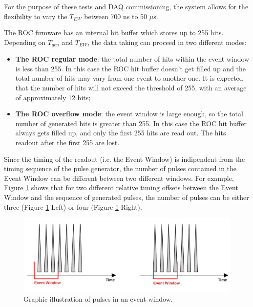     For the purpose of these tests and DAQ commissioning, 
    the system allows for the flexibility to vary 
    the $T_{EW}$ between 700 ns to 50 
    $\mu$s. 

    The ROC firmware has an internal hit buffer 
    which stores up to 255 hits. 
    Depending on $T_{gen}$ and $T_{EW}$, the data 
    taking can proceed in two different modes:
    \begin{itemize}
      \item \textbf{The ROC regular mode}: the total number of hits 
      within the event window is less than 255.
      In this case the ROC hit buffer doesn't get filled up 
      and the total number of 
      hits may vary from one event to another one. It is 
      expected that the number 
      of hits will not exceed the threshold of 255, 
      with an average of approximately 12 hits;
    \item \textbf{The ROC overflow mode}: the event window 
    is large enough, 
    so the total number of generated hits is 
      greater than 255. In this case
      the ROC hit buffer always gets filled up, and only 
      the first 255 hits are read out. 
      The hits readout after the first 255 are lost.
    \end{itemize}

    Since the timing of the readout (i.e. the Event Window) 
    is indipendent from the timing sequence 
    of the pulse generator, the number of pulses contained in 
    the Event Window can be different between two different 
    windows. 
    For example, Figure \ref{fig:timing} shows 
    that for two different relative timing offsets between 
    the Event Window and the sequence of generated pulses, 
    the number of pulses can be 
    either three (Figure \ref{fig:timing} Left) 
    or four (Figure \ref{fig:timing} Right).

    \begin{figure}[!h]
    \centering
    \includegraphics[width =1\textwidth]{figures/png/finalimg.png}
    \caption{Graphic illustration of pulses in an event window.}
    \label{fig:timing}
    \end{figure}

